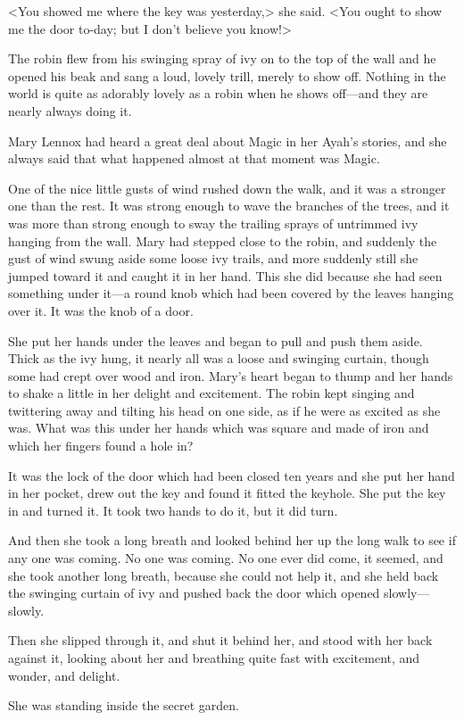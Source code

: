 <You showed me where the key was yesterday,> she said. <You ought to show me the door to-day; but I don't believe you know!>

The robin flew from his swinging spray of ivy on to the top of the wall and he opened his beak and sang a loud, lovely trill, merely to show off. Nothing in the world is quite as adorably lovely as a robin when he shows off—and they are nearly always doing it.

Mary Lennox had heard a great deal about Magic in her Ayah's stories, and she always said that what happened almost at that moment was Magic.

One of the nice little gusts of wind rushed down the walk, and it was a stronger one than the rest. It was strong enough to wave the branches of the trees, and it was more than strong enough to sway the trailing sprays of untrimmed ivy hanging from the wall. Mary had stepped close to the robin, and suddenly the gust of wind swung aside some loose ivy trails, and more suddenly still she jumped toward it and caught it in her hand. This she did because she had seen something under it—a round knob which had been covered by the leaves hanging over it. It was the knob of a door.

She put her hands under the leaves and began to pull and push them aside. Thick as the ivy hung, it nearly all was a loose and swinging curtain, though some had crept over wood and iron. Mary's heart began to thump and her hands to shake a little in her delight and excitement. The robin kept singing and twittering away and tilting his head on one side, as if he were as excited as she was. What was this under her hands which was square and made of iron and which her fingers found a hole in?

It was the lock of the door which had been closed ten years and she put her hand in her pocket, drew out the key and found it fitted the keyhole. She put the key in and turned it. It took two hands to do it, but it did turn.

And then she took a long breath and looked behind her up the long walk to see if any one was coming. No one was coming. No one ever did come, it seemed, and she took another long breath, because she could not help it, and she held back the swinging curtain of ivy and pushed back the door which opened slowly—slowly.

Then she slipped through it, and shut it behind her, and stood with her back against it, looking about her and breathing quite fast with excitement, and wonder, and delight.

She was standing inside the secret garden.
